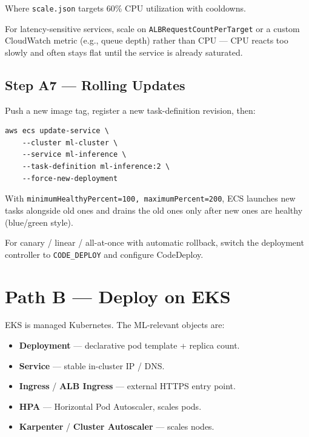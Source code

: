 \documentclass[11pt,a4paper]{article}
\begin{document}
Where \texttt{scale.json} targets 60\% CPU utilization with cooldowns.

\begin{tipbox}
For latency-sensitive services, scale on
\texttt{ALBRequestCountPerTarget} or a custom CloudWatch metric
(e.g., queue depth) rather than CPU --- CPU reacts too slowly and often stays
flat until the service is already saturated.
\end{tipbox}

\subsection{Step A7 --- Rolling Updates}

Push a new image tag, register a new task-definition revision, then:

\begin{lstlisting}[style=bashcode]
aws ecs update-service \
    --cluster ml-cluster \
    --service ml-inference \
    --task-definition ml-inference:2 \
    --force-new-deployment
\end{lstlisting}

With \texttt{minimumHealthyPercent=100, maximumPercent=200}, ECS launches new
tasks alongside old ones and drains the old ones only after new ones are
healthy (blue/green style).

For canary / linear / all-at-once with automatic rollback, switch the
deployment controller to \texttt{CODE\_DEPLOY} and configure CodeDeploy.

\section{Path B --- Deploy on EKS}

EKS is managed Kubernetes. The ML-relevant objects are:

\begin{itemize}[leftmargin=*,nosep]
    \item \textbf{Deployment} --- declarative pod template + replica count.
    \item \textbf{Service} --- stable in-cluster IP / DNS.
    \item \textbf{Ingress} / \textbf{ALB Ingress} --- external HTTPS entry point.
    \item \textbf{HPA} --- Horizontal Pod Autoscaler, scales pods.
    \item \textbf{Karpenter} / \textbf{Cluster Autoscaler} --- scales nodes.
\end{itemize}
\end{document}
